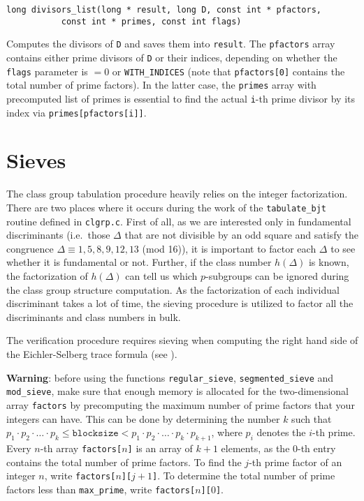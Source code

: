 \documentclass[a4paper,10pt]{article}
\newcommand{\code}{\lstinline}
\begin{document}
\begin{lstlisting}
long divisors_list(long * result, long D, const int * pfactors,
		   const int * primes, const int flags)
\end{lstlisting}

Computes the divisors of \code{D} and saves them into \code{result}. The \code{pfactors} array contains either prime divisors of \code{D} or their indices, depending on whether the \code{flags} parameter is $=0$ or \code{WITH_INDICES} (note that \code{pfactors[0]} contains the total number of prime factors). In the latter case, the \code{primes} array with precomputed list of primes is essential to find the actual \code{i}-th prime divisor by its index via \code{primes[pfactors[i]]}.





\section{Sieves} \label{subsec:sieve}

The class group tabulation procedure heavily relies on the integer factorization. There are two places where it occurs during the work of the \code{tabulate_bjt} routine defined in \code{clgrp.c}. First of all, as we are interested only in fundamental discriminants (i.e.\ those $\Delta$ that are not divisible by an odd square and satisfy the congruence $\Delta \equiv 1, 5, 8, 9, 12, 13$ (mod 16)), it is important to factor each $\Delta$ to see whether it is fundamental or not. Further, if the class number $h(\Delta)$ is known, the factorization of $h(\Delta)$ can tell us which $p$-subgroups can be ignored during the class group structure computation. As the factorization of each individual discriminant takes a lot of time, the sieving procedure is utilized to factor all the discriminants and class numbers in bulk.

The verification procedure requires sieving when computing the right hand side of the Eichler-Selberg trace formula (see \cite[Section 5.3]{mosunov}).

\textbf{Warning}: before using the functions \code{regular_sieve}, \code{segmented_sieve} and \code{mod_sieve}, make sure that enough memory is allocated for the two-dimensional array \code{factors} by precomputing the maximum number of prime factors that your integers can have. This can be done by determining the number $k$ such that $p_1 \cdot p_2 \cdot \ldots \cdot p_k \leq \texttt{blocksize} < p_1 \cdot p_2 \cdot \ldots \cdot p_k \cdot p_{k+1}$, where $p_i$ denotes the $i$-th prime. Every $n$-th array \texttt{factors[$n$]} is an array of $k+1$ elements, as the $0$-th entry contains the total number of prime factors. To find the $j$-th prime factor of an integer $n$, write \texttt{factors[$n$][$j+1$]}. To determine the total number of prime factors less than \code{max_prime}, write \texttt{factors[$n$][$0$]}.
\end{document}
